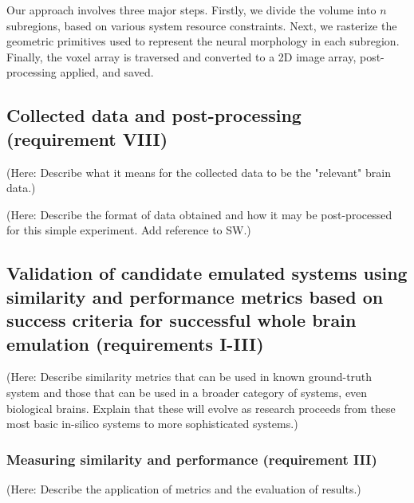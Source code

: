 \documentclass{ldr-article}
\begin{document}
Our approach involves three major steps. Firstly, we divide the volume into $n$ subregions, based on various system resource constraints. Next, we rasterize the geometric primitives used to represent the neural morphology in each subregion. Finally, the voxel array is traversed and converted to a 2D image array, post-processing applied, and saved.




\subsection{Collected data and post-processing (requirement VIII)}

(Here: Describe what it means for the collected data to be the "relevant" brain data.)

(Here: Describe the format of data obtained and how it may be post-processed for this simple experiment. Add reference to SW.)

\subsection{Validation of candidate emulated systems using similarity and performance metrics based on success criteria for successful whole brain emulation (requirements I-III)}

(Here: Describe similarity metrics that can be used in known ground-truth system and those that can be used in a broader category of systems, even biological brains. Explain that these will evolve as research proceeds from these most basic in-silico systems to more sophisticated systems.)

\subsubsection{Measuring similarity and performance (requirement III)}

(Here: Describe the application of metrics and the evaluation of results.)
\end{document}

